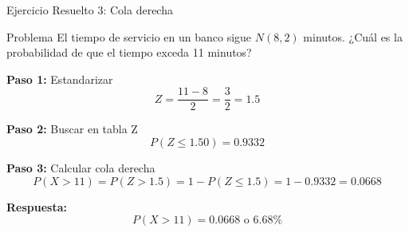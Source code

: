 \documentclass[10pt]{beamer}
\begin{document}
\begin{frame}{Ejercicio Resuelto 3: Cola derecha}
\begin{exampleblock}{Problema}
El tiempo de servicio en un banco sigue $N(8, 2)$ minutos. ¿Cuál es la probabilidad de que el tiempo exceda 11 minutos?
\end{exampleblock}

\vspace{0.2cm}
\begin{block}{\textbf{Paso 1:} Estandarizar}
$$Z = \frac{11 - 8}{2} = \frac{3}{2} = 1.5$$
\end{block}

\begin{block}{\textbf{Paso 2:} Buscar en tabla Z}
$$P(Z \leq 1.50) = 0.9332$$
\end{block}

\begin{block}{\textbf{Paso 3:} Calcular cola derecha}
$$P(X > 11) = P(Z > 1.5) = 1 - P(Z \leq 1.5) = 1 - 0.9332 = 0.0668$$
\end{block}

\begin{exampleblock}{\textbf{Respuesta:}}
$$\boxed{P(X > 11) = 0.0668 \text{ o } 6.68\%}$$
\end{exampleblock}
\end{frame}
\end{document}
